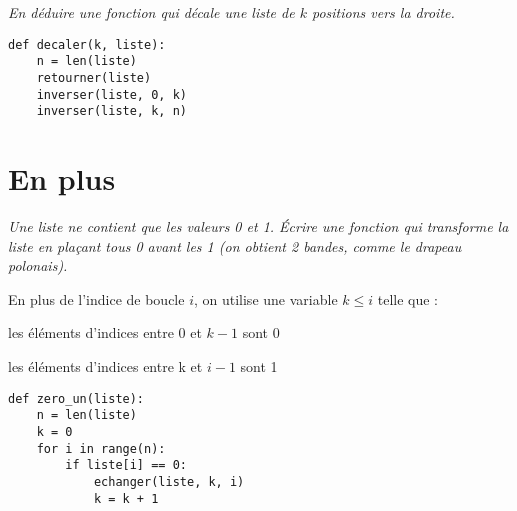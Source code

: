 \begin{Exercise}[title= Décalage]\it
En déduire une fonction  qui décale une liste de $k$ positions vers la droite.
\end{Exercise}
\begin{Answer}
\begin{lstlisting}
def decaler(k, liste):
    n = len(liste)
    retourner(liste)
    inverser(liste, 0, k)
    inverser(liste, k, n)
\end{lstlisting}
\newpage
\end{Answer}
\section{En plus} 
\begin{Exercise}[title= Drapeau polonais]\it
Une liste ne contient que les valeurs 0 et 1. Écrire une fonction qui transforme la liste en plaçant tous 0 avant les 1 (on obtient 2 bandes, comme le drapeau polonais).
\end{Exercise}
\begin{Answer}

En plus de l'indice de boucle $i$, on utilise une variable $k\le i$ telle que :

les éléments d'indices entre 0 et $k-1$ sont 0

les éléments d'indices entre k et $i-1$ sont 1

\begin{lstlisting}
def zero_un(liste):
    n = len(liste)
    k = 0
    for i in range(n):
        if liste[i] == 0:
            echanger(liste, k, i)
            k = k + 1
\end{lstlisting}
\end{Answer}
\medskip

